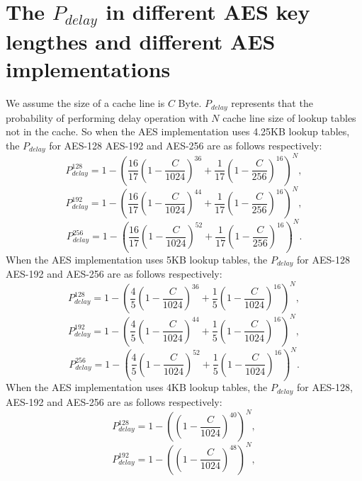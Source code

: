 \section{The $P_{delay}$ in different AES key lengthes and different AES implementations }
\label{appendixb}
We assume the size of a cache line is $C$ Byte. $P_{delay}$ represents that the probability of performing delay operation with $N$ cache line size of lookup tables not in the cache. So when the AES implementation uses 4.25KB lookup tables, the $P_{delay}$ for AES-128 AES-192 and AES-256 are as follows respectively:
\begin{equation}
    P_{delay}^{128} = 1- (\frac{16}{17}(1-\frac{C}{1024})^{36}+ \frac{1}{17}(1-\frac{C}{256})^{16})^{N},
\end{equation}
\begin{equation}
    P_{delay}^{192} = 1- (\frac{16}{17}(1-\frac{C}{1024})^{44}+ \frac{1}{17}(1-\frac{C}{256})^{16})^{N},
\end{equation}
\begin{equation}
    P_{delay}^{256} = 1- (\frac{16}{17}(1-\frac{C}{1024})^{52}+ \frac{1}{17}(1-\frac{C}{256})^{16})^{N}.
\end{equation}
When the AES implementation uses 5KB lookup tables, the $P_{delay}$ for AES-128 AES-192 and AES-256 are as follows respectively:
\begin{equation}
    P_{delay}^{128} = 1- (\frac{4}{5}(1-\frac{C}{1024})^{36}+ \frac{1}{5}(1-\frac{C}{1024})^{16})^{N},
\end{equation}
\begin{equation}
    P_{delay}^{192} = 1- (\frac{4}{5}(1-\frac{C}{1024})^{44}+ \frac{1}{5}(1-\frac{C}{1024})^{16})^{N},
\end{equation}
\begin{equation}
    P_{delay}^{256} = 1- (\frac{4}{5}(1-\frac{C}{1024})^{52}+ \frac{1}{5}(1-\frac{C}{1024})^{16})^{N}.
\end{equation}
When the AES implementation uses 4KB lookup tables, the $P_{delay}$ for AES-128, AES-192 and AES-256 are as follows respectively:
\begin{equation}
    P_{delay}^{128} = 1- ((1-\frac{C}{1024})^{40})^{N},
\end{equation}
\begin{equation}
    P_{delay}^{192} = 1- ((1-\frac{C}{1024})^{48})^{N},
\end{equation}

